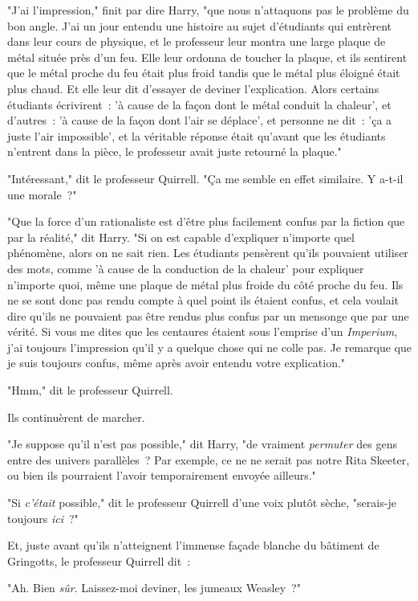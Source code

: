 "J'ai l'impression," finit par dire Harry, "que nous n'attaquons pas le problème du bon angle. J'ai un jour entendu une histoire au sujet d'étudiants qui entrèrent dans leur cours de physique, et le professeur leur montra une large plaque de métal située près d'un feu. Elle leur ordonna de toucher la plaque, et ils sentirent que le métal proche du feu était plus froid tandis que le métal plus éloigné était plus chaud. Et elle leur dit d'essayer de deviner l'explication. Alors certains étudiants écrivirent~: 'à cause de la façon dont le métal conduit la chaleur', et d'autres~: 'à cause de la façon dont l'air se déplace', et personne ne dit~: 'ça a juste l'air impossible', et la véritable réponse était qu'avant que les étudiants n'entrent dans la pièce, le professeur avait juste retourné la plaque."

"Intéressant," dit le professeur Quirrell. "Ça me semble en effet similaire. Y a-t-il une morale~?"

"Que la force d'un rationaliste est d'être plus facilement confus par la fiction que par la réalité," dit Harry. "Si on est capable d'expliquer n'importe quel phénomène, alors on ne sait rien. Les étudiants pensèrent qu'ils pouvaient utiliser des mots, comme 'à cause de la conduction de la chaleur' pour expliquer n'importe quoi, même une plaque de métal plus froide du côté proche du feu. Ils ne se sont donc pas rendu compte à quel point ils étaient confus, et cela voulait dire qu'ils ne pouvaient pas être rendus plus confus par un mensonge que par une vérité. Si vous me dites que les centaures étaient sous l'emprise d'un \emph{Imperium}, j'ai toujours l'impression qu'il y a quelque chose qui ne colle pas. Je remarque que je suis toujours confus, même après avoir entendu votre explication."

"Hmm," dit le professeur Quirrell.

Ils continuèrent de marcher.

"Je suppose qu'il n'est pas possible," dit Harry, "de vraiment \emph{permuter} des gens entre des univers parallèles~? Par exemple, ce ne ne serait pas notre Rita Skeeter, ou bien ils pourraient l'avoir temporairement envoyée ailleurs."

"Si \emph{c'était} possible," dit le professeur Quirrell d'une voix plutôt sèche, "serais-je toujours \emph{ici}~?"

Et, juste avant qu'ils n'atteignent l'immense façade blanche du bâtiment de Gringotts, le professeur Quirrell dit~:

"Ah. Bien \emph{sûr}. Laissez-moi deviner, les jumeaux Weasley~?"

